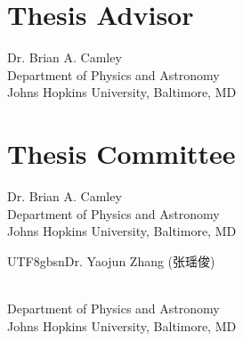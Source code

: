 \vspace{0.3in}

\begin{singlespace}
\large
    \section*{Thesis Advisor}
    
    Dr. Brian A. Camley \\[0.05in]
    {\normalsize Department of Physics and Astronomy\\
    Johns Hopkins University, Baltimore, MD }


    
    
    


    \section*{Thesis Committee}

    \begin{minipage}[t]{0.45\textwidth}
    Dr. Brian A. Camley \\[0.05in]
    {\normalsize Department of Physics and Astronomy\\
    Johns Hopkins University, Baltimore, MD }
    \end{minipage}
    \hfill
    \begin{minipage}[t]{0.51\textwidth}
    \begin{CJK*}{UTF8}{gbsn}Dr. Yaojun Zhang (张瑶俊)\end{CJK*} \\[0.05in]
    {\normalsize Department of Physics and Astronomy\\
    Johns Hopkins University, Baltimore, MD }
    \end{minipage}


\end{singlespace}
